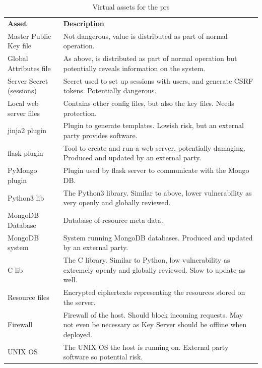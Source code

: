 \begin{appendices}
\begin{table}[htp]
  \begin{tabularx}{\linewidth}{lX}
    \textbf{Asset}            & \textbf{Description} \\
    Master Public Key file    &	Not dangerous, value is distributed as part of normal operation. \\
    Global Attributes file    &	As above, is distributed as part of normal operation but potentially reveals information on the system. \\
    Server Secret (sessions)  &	Secret used to set up sessions with users, and generate CSRF tokens. Potentially dangerous. \\
    Local web server files    &	Contains other config files, but also the key files. Needs protection. \\
    jinja2 plugin             &	Plugin to generate templates. Lowish risk, but an external party provides software. \\
    flask plugin              &	Tool to create and run a web server, potentially damaging. Produced and updated by an external party. \\
    PyMongo plugin            &	Plugin used by flask server to communicate with the Mongo DB. \\
    Python3 lib               &	The Python3 library. Similar to above, lower vulnerability as very openly and globally reviewed. \\
    MongoDB Database          & Database of resource meta data. \\
    MongoDB system            & System running MongoDB databases. Produced and updated by an external party. \\
    C lib                     &	The C library. Similar to Python, low vulnerability as extremely openly and globally reviewed. Slow to update as well. \\
    Resource files            & Encrypted ciphertexts representing the resources stored on the server. \\
    Firewall                  &	Firewall of the host. Should block incoming requests. May not even be necessary as Key Server should be offline when deployed. \\
    UNIX OS                   &	The UNIX OS the host is running on. External party software so potential risk.
  \end{tabularx}
  \caption{Virtual assets for the \acrfull{prs}}
  \label{tab:virtual_assets_pr}
\end{table}


\end{appendices}
